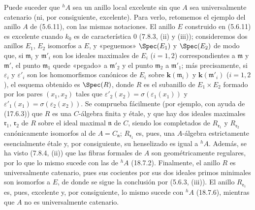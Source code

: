 \begin{remark}[18.7.7]
\label{IV.18.7.7}
Puede suceder que ${}^h\!A$ sea un anillo local excelente sin que $A$ sea universalmente catenario (ni, por consiguiente, excelente). Para verlo, retomemos el ejemplo del anillo $A$ de (5.6.11), con las mismas notaciones. El anillo $E$ construido en (5.6.11) es excelente cuando $k_0$ es de característica $0$ (7.8.3, (ii) y (iii)); consideremos dos anillos $E_1$, $E_2$ isomorfos a $E$, y «peguemos» $\Spec(E_1)$ y $\Spec(E_2)$ de modo que, si $\mathfrak m_i$ y $\mathfrak m'_i$ son los ideales maximales de $E_i$ ($i=1,2$) correspondientes a $\mathfrak m$ y $\mathfrak m'$, el punto $\mathfrak m_1$ quede «pegado» a $\mathfrak m'_2$ y el punto $\mathfrak m_2$ a $\mathfrak m'_1$; más precisamente, si $\varepsilon_i$ y $\varepsilon'_i$ son los homomorfismos canónicos de $E_i$ sobre $\boldsymbol{k}(\mathfrak m_i)$ y $\boldsymbol{k}(\mathfrak m'_i)$ ($i=1,2$), el esquema obtenido es $\Spec(R)$, donde $R$ es el subanillo de $E_1\times E_2$ formado por los pares $(x_1,x_2)$ tales que $\varepsilon'_2(x_2)=\sigma(\varepsilon_1(x_1))$ y $\varepsilon'_1(x_1)=\sigma(\varepsilon_2(x_2))$. Se comprueba fácilmente (por ejemplo, con ayuda de (17.6.3)) que $R$ es una $C$-álgebra finita y étale, y que hay dos ideales maximales $\mathfrak r_1$, $\mathfrak r_2$ de $R$ sobre el ideal maximal $\mathfrak n$ de $C$, siendo los completados de $R_{\mathfrak r_1}$ y $R_{\mathfrak r_2}$ canónicamente isomorfos al de $A=C_{\mathfrak n}$; $R_{\mathfrak r_1}$ es, pues, una $A$-álgebra estrictamente esencialmente étale y, por consiguiente, su henselizado es igual a ${}^h\!A$. Además, se ha visto (7.8.4, (ii)) que las fibras formales de $A$ son geométricamente regulares, por lo que lo mismo sucede con las de ${}^h\!A$ (18.7.2). Finalmente, el anillo $R$ es universalmente catenario, pues sus cocientes por sus dos ideales primos minimales son isomorfos a $E$, de donde se sigue la conclusión por (5.6.3, (iii)). El anillo $R_{\mathfrak r_1}$ es, pues, excelente y, por consiguiente, lo mismo sucede con ${}^h\!A$ (18.7.6), mientras que $A$ no es universalmente catenario.
\end{remark}
